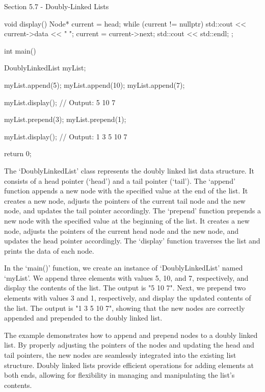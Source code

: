 \begin{notes}{Section 5.7 - Doubly-Linked Lists}
\begin{highlight}
\begin{code}[C++]
{        void display() {
            Node* current = head;
            while (current != nullptr) {
                std::cout << current->data << " ";
                current = current->next;
            }
            std::cout << std::endl;
        }
    };

    int main() {
        DoublyLinkedList myList;

        myList.append(5);
        myList.append(10);
        myList.append(7);

        myList.display();  // Output: 5 10 7

        myList.prepend(3);
        myList.prepend(1);

        myList.display();  // Output: 1 3 5 10 7

        return 0;
    }
    \end{code}
        The `DoublyLinkedList' class represents the doubly linked list data structure. It consists of a head pointer (`head') and a tail pointer (`tail'). The `append' function appends a new node with the specified value at the end of the list. It creates a new node, adjusts the pointers of the current tail node and 
        the new node, and updates the tail pointer accordingly. The `prepend' function prepends a new node with the specified value at the beginning of the list. It creates a new node, adjusts the pointers of the current head node and the new node, and updates the head pointer accordingly. The `display' function traverses 
        the list and prints the data of each node.
    
        In the `main()' function, we create an instance of `DoublyLinkedList' named `myList'. We append three elements with values 5, 10, and 7, respectively, and display the contents of the list. The output is "5 10 7". Next, we prepend two elements with values 3 and 1, respectively, and display the updated contents of 
        the list. The output is "1 3 5 10 7", showing that the new nodes are correctly appended and prepended to the doubly linked list.
    
        The example demonstrates how to append and prepend nodes to a doubly linked list. By properly adjusting the pointers of the nodes and updating the head and tail pointers, the new nodes are seamlessly integrated into the existing list structure. Doubly linked lists provide efficient operations for adding elements at 
        both ends, allowing for flexibility in managing and manipulating the list's contents.
    \end{highlight}
\end{notes}

